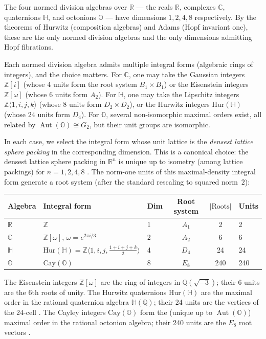 \documentclass[11pt,reqno]{amsart}
\theoremstyle{plain}
\theoremstyle{definition}
\theoremstyle{remark}
\newcommand{\R}{\mathbb{R}}
\newcommand{\Z}{\mathbb{Z}}
\newcommand{\C}{\mathbb{C}}
\newcommand{\HH}{\mathbb{H}}
\newcommand{\OO}{\mathbb{O}}
\newcommand{\Hur}{\mathrm{Hur}}
\newcommand{\Cay}{\mathrm{Cay}}
\DeclareMathOperator{\Aut}{Aut}
\begin{document}
The four normed division algebras over $\R$ ---
the reals $\R$, complexes $\C$, quaternions $\HH$, and
octonions $\OO$ ---
have dimensions $1, 2, 4, 8$ respectively.
By the theorems of Hurwitz \cite{Hurwitz1898} (composition algebras)
and Adams \cite{Adams1960} (Hopf invariant one),
these are the only normed division algebras and the only dimensions
admitting Hopf fibrations.

Each normed division algebra admits multiple integral forms
(algebraic rings of integers), and the choice matters.
For $\C$, one may take the Gaussian integers $\Z[i]$
(whose $4$ units form the root system $B_1 \times B_1$)
or the Eisenstein integers $\Z[\omega]$
(whose $6$ units form $A_2$).
For $\HH$, one may take the Lipschitz integers
$\Z\langle 1,i,j,k\rangle$ (whose $8$ units form $D_2 \times D_2$),
or the Hurwitz integers $\Hur(\HH)$ (whose $24$ units form $D_4$).
For $\OO$, several non-isomorphic maximal orders exist,
all related by $\Aut(\OO) \cong G_2$, but their unit groups
are isomorphic.

In each case, we select the integral form whose unit lattice
is the \emph{densest lattice sphere packing} in the
corresponding dimension.
This is a canonical choice: the densest lattice sphere packing
in $\R^n$ is unique up to isometry (among lattice packings)
for $n = 1, 2, 4, 8$
\cite{ConwaySloane1999,Viazovska2017}.
The norm-one units of this maximal-density integral form
generate a root system
(after the standard rescaling to squared norm~$2$):

\medskip
\begin{center}
\begin{tabular}{@{}lllccl@{}}
\toprule
Algebra & Integral form & Dim & Root system & $|\text{Roots}|$
  & Units \\
\midrule
$\R$ & $\Z$ & 1 & $A_1$ & 2 & 2 \\
$\C$ & $\Z[\omega]$, $\omega = e^{2\pi i/3}$ & 2 & $A_2$ & 6
  & 6 \\
$\HH$ & $\Hur(\HH) = \Z\langle 1,i,j,\tfrac{1+i+j+k}{2}\rangle$
       & 4 & $D_4$ & 24 & 24 \\
$\OO$ & $\Cay(\OO)$ & 8 & $E_8$ & 240 & 240 \\
\bottomrule
\end{tabular}
\end{center}
\medskip

The Eisenstein integers $\Z[\omega]$ are the ring of integers in
$\mathbb{Q}(\sqrt{-3})$; their $6$ units are the
$6$th roots of unity.
The Hurwitz quaternions $\Hur(\HH)$ are the maximal order in the
rational quaternion algebra $\HH(\mathbb{Q})$;
their 24 units are the vertices of the 24-cell
\cite{ConwaySloane1999}.
The Cayley integers $\Cay(\OO)$ form the (unique up to
$\Aut(\OO)$) maximal order in the rational octonion algebra;
their 240 units are the $E_8$ root vectors
\cite{ConwaySloane1999,Coxeter1946}.
\end{document}
